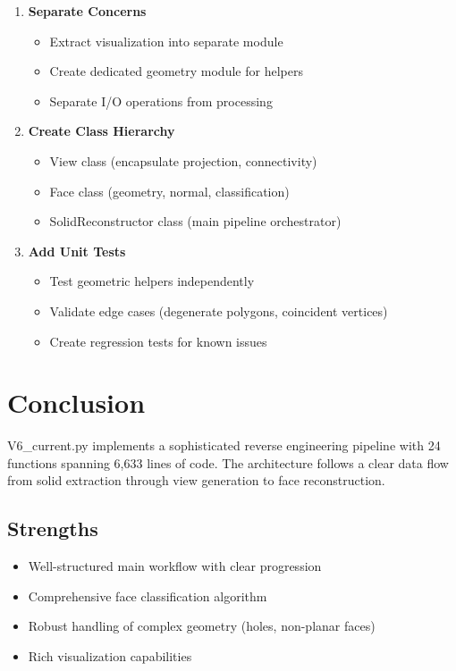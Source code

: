 \documentclass[11pt,a4paper]{article}
\begin{document}
\begin{enumerate}
    \item \textbf{Separate Concerns}
    \begin{itemize}
        \item Extract visualization into separate module
        \item Create dedicated geometry module for helpers
        \item Separate I/O operations from processing
    \end{itemize}
    
    \item \textbf{Create Class Hierarchy}
    \begin{itemize}
        \item View class (encapsulate projection, connectivity)
        \item Face class (geometry, normal, classification)
        \item SolidReconstructor class (main pipeline orchestrator)
    \end{itemize}
    
    \item \textbf{Add Unit Tests}
    \begin{itemize}
        \item Test geometric helpers independently
        \item Validate edge cases (degenerate polygons, coincident vertices)
        \item Create regression tests for known issues
    \end{itemize}
\end{enumerate}

\newpage
\section{Conclusion}

V6\_current.py implements a sophisticated reverse engineering pipeline with 24 functions spanning 6,633 lines of code. The architecture follows a clear data flow from solid extraction through view generation to face reconstruction.

\subsection{Strengths}
\begin{itemize}
    \item Well-structured main workflow with clear progression
    \item Comprehensive face classification algorithm
    \item Robust handling of complex geometry (holes, non-planar faces)
    \item Rich visualization capabilities
\end{itemize}
\end{document}
